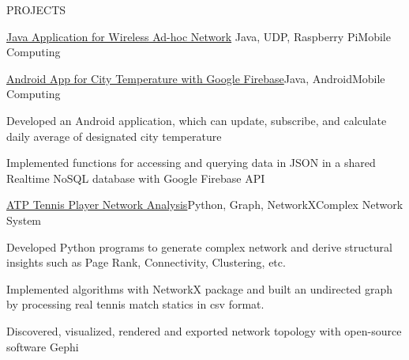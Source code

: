 \documentclass{resume} %
\begin{document}
\begin{rSection}{PROJECTS}
\begin{rSubsection}{\href{https://github.com/kuangyu0801/MobileComputing_SS20_assign04}{Java Application for Wireless Ad-hoc Network}} {Java, UDP, Raspberry Pi}{Mobile Computing}{}
\end{rSubsection}
\begin{rSubsection}{\href{https://github.com/kuangyu0801/MobileComputing_SS20_assign03}{Android App for City Temperature with Google Firebase}}{Java, Android}{Mobile Computing}{}
\item Developed an Android application, which can update, subscribe, and calculate daily average of designated city temperature
\item Implemented functions for accessing and querying  data in JSON in a shared Realtime NoSQL database  with Google Firebase API
\end{rSubsection}
\begin{rSubsection}{\href{https://github.com/kuangyu0801/WS19_ComplexNetworkSystem}{ATP Tennis Player Network Analysis}}{Python, Graph, NetworkX}{Complex Network System}{}
\item Developed Python programs to generate complex network and derive structural insights such as Page Rank, Connectivity, Clustering, etc.
\item Implemented algorithms with NetworkX package and built an undirected graph by processing real tennis match statics in csv format.
\item Discovered, visualized, rendered and exported network topology with open-source software Gephi
\end{rSubsection}

\end{rSection}







\end{document}
